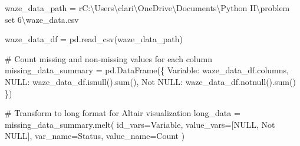 \documentclass[
  letterpaper,
  DIV=11,
  numbers=noendperiod]{scrartcl}
\newenvironment{Shaded}{\begin{snugshade}}{\end{snugshade}}
\newcommand{\BuiltInTok}[1]{\textcolor[rgb]{0.00,0.23,0.31}{#1}}
\newcommand{\CommentTok}[1]{\textcolor[rgb]{0.37,0.37,0.37}{#1}}
\newcommand{\NormalTok}[1]{\textcolor[rgb]{0.00,0.23,0.31}{#1}}
\newcommand{\OperatorTok}[1]{\textcolor[rgb]{0.37,0.37,0.37}{#1}}
\newcommand{\StringTok}[1]{\textcolor[rgb]{0.13,0.47,0.30}{#1}}
\newcommand{\VerbatimStringTok}[1]{\textcolor[rgb]{0.13,0.47,0.30}{#1}}
\begin{document}
\begin{Shaded}
\begin{Highlighting}[]
\NormalTok{waze\_data\_path }\OperatorTok{=} \VerbatimStringTok{r\textquotesingle{}C:\textbackslash{}Users\textbackslash{}clari\textbackslash{}OneDrive\textbackslash{}Documents\textbackslash{}Python II\textbackslash{}problem set 6\textbackslash{}waze\_data.csv\textquotesingle{}} 

\NormalTok{waze\_data\_df }\OperatorTok{=}\NormalTok{ pd.read\_csv(waze\_data\_path)}

\CommentTok{\# Count missing and non{-}missing values for each column}
\NormalTok{missing\_data\_summary }\OperatorTok{=}\NormalTok{ pd.DataFrame(\{}
    \StringTok{\textquotesingle{}Variable\textquotesingle{}}\NormalTok{: waze\_data\_df.columns,}
    \StringTok{\textquotesingle{}NULL\textquotesingle{}}\NormalTok{: waze\_data\_df.isnull().}\BuiltInTok{sum}\NormalTok{(),}
    \StringTok{\textquotesingle{}Not NULL\textquotesingle{}}\NormalTok{: waze\_data\_df.notnull().}\BuiltInTok{sum}\NormalTok{()}
\NormalTok{\})}

\CommentTok{\# Transform to long format for Altair visualization}
\NormalTok{long\_data }\OperatorTok{=}\NormalTok{ missing\_data\_summary.melt(}
\NormalTok{    id\_vars}\OperatorTok{=}\StringTok{\textquotesingle{}Variable\textquotesingle{}}\NormalTok{,}
\NormalTok{    value\_vars}\OperatorTok{=}\NormalTok{[}\StringTok{\textquotesingle{}NULL\textquotesingle{}}\NormalTok{, }\StringTok{\textquotesingle{}Not NULL\textquotesingle{}}\NormalTok{],}
\NormalTok{    var\_name}\OperatorTok{=}\StringTok{\textquotesingle{}Status\textquotesingle{}}\NormalTok{,}
\NormalTok{    value\_name}\OperatorTok{=}\StringTok{\textquotesingle{}Count\textquotesingle{}}
\NormalTok{)}


\end{Highlighting}
\end{Shaded}
\end{document}
